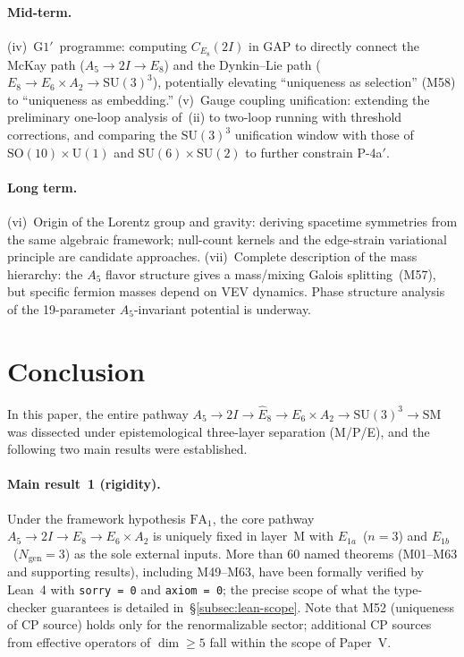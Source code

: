 \documentclass[sn-mathphys-num,Numbered]{sn-jnl}
\theoremstyle{thmstyleone}
\theoremstyle{thmstylethree}
\newcommand{\Ngen}{N_{\mathrm{gen}}}
\newcommand{\SU}{\mathrm{SU}}
\newcommand{\SO}{\mathrm{SO}}
\newcommand{\U}{\mathrm{U}}
\newcommand{\Ehat}{\hat{E}}
\begin{document}
\paragraph{Mid-term.}
(iv)~$\mathrm{G1}'$~programme: computing $C_{E_8}(2I)$ in GAP to directly
connect the McKay path ($A_5 \to 2I \to E_8$) and the Dynkin--Lie path ($E_8
\to E_6 \times A_2 \to \SU(3)^3$), potentially elevating ``uniqueness as
selection'' (M58) to ``uniqueness as embedding.''
(v)~Gauge coupling unification: extending the preliminary one-loop analysis
of~(ii) to two-loop running with threshold corrections, and comparing the
$\SU(3)^3$ unification window with those of $\SO(10) \times \U(1)$ and
$\SU(6) \times \SU(2)$ to further constrain P-4a$'$.

\paragraph{Long term.}
(vi)~Origin of the Lorentz group and gravity: deriving spacetime symmetries
from the same algebraic framework; null-count kernels and the edge-strain
variational principle are candidate approaches.
(vii)~Complete description of the mass hierarchy: the $A_5$ flavor structure
gives a mass/mixing Galois splitting~(M57), but specific fermion masses depend
on VEV dynamics.  Phase structure analysis of the 19-parameter $A_5$-invariant
potential is underway.


\section{Conclusion}\label{sec:conclusion}

In this paper, the entire pathway $A_5 \to 2I \to \Ehat_8 \to E_6 \times A_2
\to \SU(3)^3 \to \text{SM}$ was dissected under epistemological three-layer
separation (M/P/E), and the following two main results were established.

\paragraph{Main result~1 (rigidity).}
Under the framework hypothesis $\mathrm{FA}_1$, the core pathway $A_5 \to 2I
\to \Ehat_8 \to E_6 \times A_2$ is uniquely fixed in layer~M with
$E_{1a}$~($n=3$) and $E_{1b}$~($\Ngen = 3$) as the sole external inputs.
More than 60 named theorems (M01--M63 and supporting results), including
M49--M63, have been formally verified by
Lean~4 with \texttt{sorry\,=\,0} and \texttt{axiom\,=\,0}; the precise scope
of what the type-checker guarantees is detailed in~\S\ref{subsec:lean-scope}.
Note that M52
(uniqueness of CP source) holds only for the renormalizable sector; additional
CP sources from effective operators of $\dim \geq 5$ fall within the scope of
Paper~V.
\end{document}
